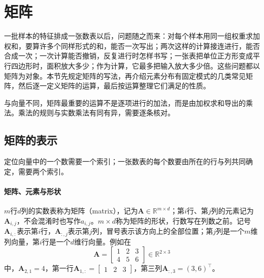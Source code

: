 
\section{矩阵}
\label{sec:ls-matrices}

一批样本的特征排成一张数表以后，问题随之而来：对每个样本用同一组权重求加权和，要算许多个同样形式的和，能否一次写出；两次这样的计算接连进行，能否合成一次；一次计算能否撤销，反复进行时怎样书写；一张表把单位正方形变成平行四边形时，面积放大多少；作为计算，它最多把输入放大多少倍。这些问题都以矩阵为对象。本节先规定矩阵的写法，再介绍元素分布有固定模式的几类常见矩阵，然后逐一定义矩阵的运算，最后按运算整理它们满足的性质。

与向量不同，矩阵最重要的运算不是逐项进行的加法，而是由加权求和导出的乘法。乘法的规则与实数乘法有同有异，需要逐条核对。

\subsection{矩阵的表示}
\label{sec:ls-matrix-representation}

定位向量中的一个数需要一个索引；一张数表的每个数要由所在的行与列共同确定，需要两个索引。

\paragraph{矩阵、元素与形状}
$m$行$d$列的实数表称为矩阵（matrix），记为$\bm A\in\mathbb R^{m\times d}$；第$i$行、第$j$列的元素记为$\bm A_{i,j}$，不会混淆时也写作$a_{i,j}$。$m\times d$称为矩阵的形状，行数写在列数之前。记号$\bm A_{i,:}$表示第$i$行，$\bm A_{:,j}$表示第$j$列，冒号表示该方向上的全部位置；第$j$列是一个$m$维列向量，第$i$行是一个$d$维行向量。例如在
\[
 \bm A=\begin{bmatrix}1&2&3\\4&5&6\end{bmatrix}\in\mathbb R^{2\times3}
\]
中，$\bm A_{2,1}=4$，第一行$\bm A_{1,:}=\left[\begin{smallmatrix}1&2&3\end{smallmatrix}\right]$，第三列$\bm A_{:,3}=(3,6)^\top$。

